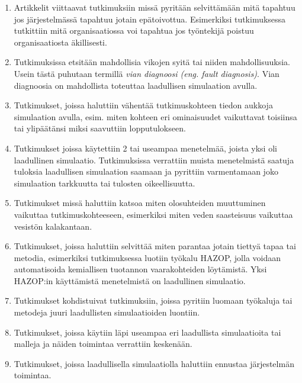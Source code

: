 \documentclass[utf8]{gradu3}
\begin{document}
\begin{enumerate}
    \item Artikkelit viittaavat tutkimuksiin missä pyritään selvittämään mitä tapahtuu jos järjestelmässä tapahtuu jotain epätoivottua. Esimerkiksi tutkimuksessa \cite{hu2015cusp} tutkittiin mitä organisaatiossa voi tapahtua jos työntekijä poistuu organisaatiosta äkillisesti.
    \item Tutkimuksissa etsitään mahdollisia vikojen syitä tai niiden mahdollisuuksia. Usein tästä puhutaan termillä \textit{ vian diagnoosi (eng. fault diagnosis)}. Vian diagnoosia on mahdollista toteuttaa laadullisen simulaation avulla.
    \item Tutkimukset, joissa haluttiin vähentää tutkimuskohteen tiedon aukkoja simulaation avulla, esim. miten kohteen eri ominaisuudet vaikuttavat toisiinsa tai ylipäätänsi miksi saavuttiin lopputulokseen.
    \item Tutkimukset joissa käytettiin 2 tai useampaa menetelmää, joista yksi oli laadullinen simulaatio. Tutkimuksissa verrattiin muista menetelmistä saatuja tuloksia laadullisen simulaation saamaan ja pyrittiin varmentamaan joko simulaation tarkkuutta tai tulosten oikeellisuutta.
    \item Tutkimukset missä haluttiin katsoa miten olosuhteiden muuttuminen vaikuttaa tutkimuskohteeseen, esimerkiksi miten veden saasteisuus vaikuttaa vesistön kalakantaan.
    \item Tutkimukset, joissa haluttiin selvittää miten parantaa jotain tiettyä tapaa tai metodia, esimerkiksi tutkimuksessa \cite{zhang2015automatic} luotiin työkalu HAZOP, jolla voidaan automatisoida kemiallisen tuotannon vaarakohteiden löytämistä. Yksi HAZOP:in käyttämistä menetelmistä on laadullinen simulaatio.
    \item Tutkimukset kohdistuivat tutkimuksiin, joissa pyritiin luomaan työkaluja tai metodeja juuri laadullisten simulaatioiden luontiin.
    \item Tutkimukset, joissa käytiin läpi useampaa eri laadullista simulaatioita tai malleja ja näiden toimintaa verrattiin keskenään.
    \item Tutkimukset, joissa laadullisella simulaatiolla haluttiin ennustaa järjestelmän toimintaa.
\end{enumerate}
\end{document}
